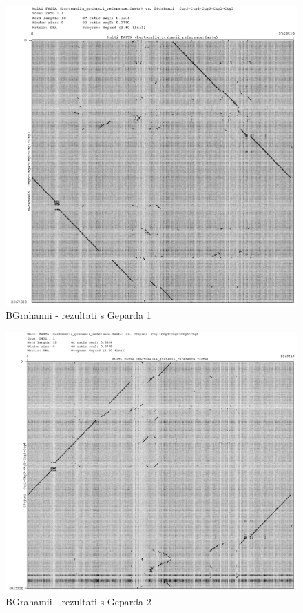 \begin{figure}[H]
    \centering
    \includegraphics[scale=0.5]{img/graph11.png}
    \caption{BGrahamii - rezultati s Geparda 1}
    \label{fig:bgrahamii1}
\end{figure}

\begin{figure}[H]
    \centering
    \includegraphics[scale=0.5]{img/graph13.png}
    \caption{BGrahamii - rezultati s Geparda 2}
    \label{fig:bgrahamii2}
\end{figure}

